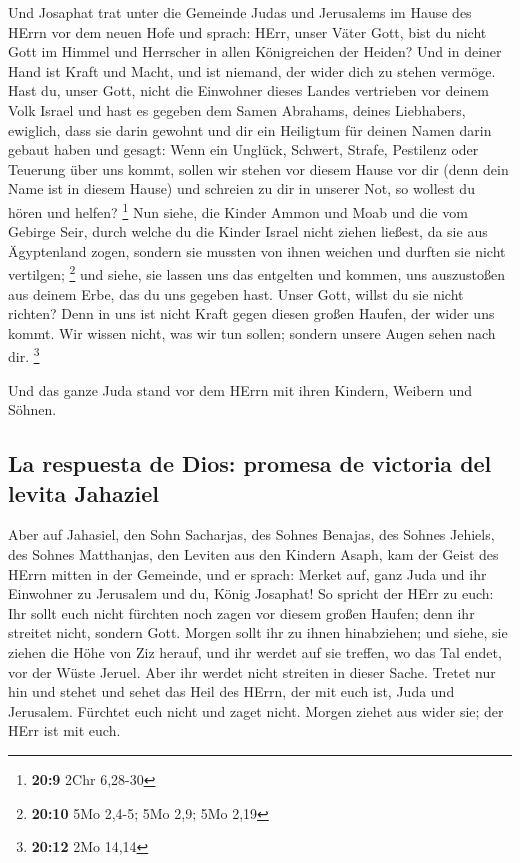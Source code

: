  Und Josaphat trat unter die Gemeinde Judas und Jerusalems
im Hause des HErrn vor dem neuen Hofe  und sprach: HErr,
unser Väter Gott, bist du nicht Gott im Himmel und Herrscher in allen
Königreichen der Heiden? Und in deiner Hand ist Kraft und Macht, und ist
niemand, der wider dich zu stehen vermöge.  Hast du, unser
Gott, nicht die Einwohner dieses Landes vertrieben vor deinem Volk
Israel und hast es gegeben dem Samen Abrahams, deines Liebhabers,
ewiglich,  dass sie darin gewohnt und dir ein Heiligtum
für deinen Namen darin gebaut haben und gesagt:  Wenn ein
Unglück, Schwert, Strafe, Pestilenz oder Teuerung über uns kommt, sollen
wir stehen vor diesem Hause vor dir (denn dein Name ist in diesem Hause)
und schreien zu dir in unserer Not, so wollest du hören und helfen?
\footnote{\textbf{20:9} 2Chr 6,28-30}  Nun siehe, die
Kinder Ammon und Moab und die vom Gebirge Seir, durch welche du die
Kinder Israel nicht ziehen ließest, da sie aus Ägyptenland zogen,
sondern sie mussten von ihnen weichen und durften sie nicht vertilgen;
\footnote{\textbf{20:10} 5Mo 2,4-5; 5Mo 2,9; 5Mo 2,19} 
und siehe, sie lassen uns das entgelten und kommen, uns auszustoßen aus
deinem Erbe, das du uns gegeben hast.  Unser Gott, willst
du sie nicht richten? Denn in uns ist nicht Kraft gegen diesen großen
Haufen, der wider uns kommt. Wir wissen nicht, was wir tun sollen;
sondern unsere Augen sehen nach dir. \footnote{\textbf{20:12} 2Mo 14,14}

 Und das ganze Juda stand vor dem HErrn mit ihren
Kindern, Weibern und Söhnen.

\hypertarget{la-respuesta-de-dios-promesa-de-victoria-del-levita-jahaziel}{%
\subsection{La respuesta de Dios: promesa de victoria del levita
Jahaziel}\label{la-respuesta-de-dios-promesa-de-victoria-del-levita-jahaziel}}

 Aber auf Jahasiel, den Sohn Sacharjas, des Sohnes
Benajas, des Sohnes Jehiels, des Sohnes Matthanjas, den Leviten aus den
Kindern Asaph, kam der Geist des HErrn mitten in der Gemeinde,
 und er sprach: Merket auf, ganz Juda und ihr Einwohner
zu Jerusalem und du, König Josaphat! So spricht der HErr zu euch: Ihr
sollt euch nicht fürchten noch zagen vor diesem großen Haufen; denn ihr
streitet nicht, sondern Gott.  Morgen sollt ihr zu ihnen
hinabziehen; und siehe, sie ziehen die Höhe von Ziz herauf, und ihr
werdet auf sie treffen, wo das Tal endet, vor der Wüste Jeruel.
 Aber ihr werdet nicht streiten in dieser Sache. Tretet
nur hin und stehet und sehet das Heil des HErrn, der mit euch ist, Juda
und Jerusalem. Fürchtet euch nicht und zaget nicht. Morgen ziehet aus
wider sie; der HErr ist mit euch.

